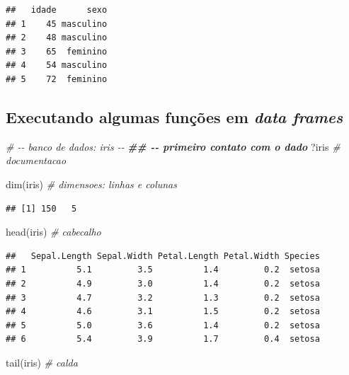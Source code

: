 \documentclass[
]{book}
\newenvironment{Shaded}{\begin{snugshade}}{\end{snugshade}}
\newcommand{\CommentTok}[1]{\textcolor[rgb]{0.56,0.35,0.01}{\textit{#1}}}
\newcommand{\DocumentationTok}[1]{\textcolor[rgb]{0.56,0.35,0.01}{\textbf{\textit{#1}}}}
\newcommand{\FunctionTok}[1]{\textcolor[rgb]{0.00,0.00,0.00}{#1}}
\newcommand{\NormalTok}[1]{#1}
\begin{document}
\begin{verbatim}
##   idade      sexo
## 1    45 masculino
## 2    48 masculino
## 3    65  feminino
## 4    54 masculino
## 5    72  feminino
\end{verbatim}

\hypertarget{executando-algumas-funuxe7uxf5es-em-data-frames}{%
\subsection{\texorpdfstring{Executando algumas funções em \emph{data frames}}{Executando algumas funções em data frames}}\label{executando-algumas-funuxe7uxf5es-em-data-frames}}

\begin{Shaded}
\begin{Highlighting}[]
\CommentTok{\# {-}{-} banco de dados: iris {-}{-}}
\DocumentationTok{\#\# {-}{-} primeiro contato com o dado}
\NormalTok{?iris }\CommentTok{\# documentacao}

\FunctionTok{dim}\NormalTok{(iris)         }\CommentTok{\# dimensoes: linhas e colunas}
\end{Highlighting}
\end{Shaded}

\begin{verbatim}
## [1] 150   5
\end{verbatim}

\begin{Shaded}
\begin{Highlighting}[]
\FunctionTok{head}\NormalTok{(iris)        }\CommentTok{\# cabecalho}
\end{Highlighting}
\end{Shaded}

\begin{verbatim}
##   Sepal.Length Sepal.Width Petal.Length Petal.Width Species
## 1          5.1         3.5          1.4         0.2  setosa
## 2          4.9         3.0          1.4         0.2  setosa
## 3          4.7         3.2          1.3         0.2  setosa
## 4          4.6         3.1          1.5         0.2  setosa
## 5          5.0         3.6          1.4         0.2  setosa
## 6          5.4         3.9          1.7         0.4  setosa
\end{verbatim}

\begin{Shaded}
\begin{Highlighting}[]
\FunctionTok{tail}\NormalTok{(iris)        }\CommentTok{\# calda}
\end{Highlighting}
\end{Shaded}
\end{document}
